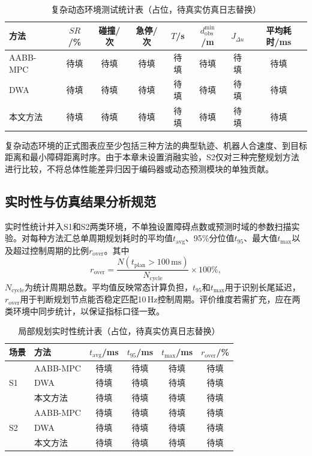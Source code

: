 \begin{table}[!htb]
	\centering
	\caption{复杂动态环境测试统计表（占位，待真实仿真日志替换）}
	\label{tab:动态仿真结果}
	\small
	\begin{tabular}{lccccccc}
		\toprule
		方法 & $SR$/\% & 碰撞/次 & 急停/次 & $T$/s & $d_{\mathrm{obs}}^{\min}$/m & $J_{\Delta u}$ & 平均耗时/ms \\
		\midrule
		AABB-MPC & 待填 & 待填 & 待填 & 待填 & 待填 & 待填 & 待填 \\
		DWA & 待填 & 待填 & 待填 & 待填 & 待填 & 待填 & 待填 \\
		本文方法 & 待填 & 待填 & 待填 & 待填 & 待填 & 待填 & 待填 \\
		\bottomrule
	\end{tabular}
\end{table}

复杂动态环境的正式图表应至少包括三种方法的典型轨迹、机器人合速度、到目标距离和最小障碍距离时序。由于本章未设置消融实验，S2仅对三种完整规划方法进行比较，不将总体性能差异归因于编码器或动态预测模块的单独贡献。

\subsection{实时性与仿真结果分析规范}
实时性统计并入S1和S2两类环境，不单独设置障碍点数或预测时域的参数扫描实验。对每种方法汇总单周期规划耗时的平均值$t_{\mathrm{avg}}$、95\%分位值$t_{95}$、最大值$t_{\max}$以及超过控制周期的比例$r_{\mathrm{over}}$。其中
\begin{equation}
	r_{\mathrm{over}}
	=
	\frac{N(t_{\mathrm{plan}}>100\,\mathrm{ms})}{N_{\mathrm{cycle}}}\times100\%,
	\label{eq:规划周期超时率}
\end{equation}
$N_{\mathrm{cycle}}$为统计周期总数。平均值反映常态计算负担，$t_{95}$和$t_{\max}$用于识别长尾延迟，$r_{\mathrm{over}}$用于判断规划节点能否稳定匹配10\,Hz控制周期。评价维度若需扩充，应在两类环境中同步统计，以保证指标口径一致。

\begin{table}[!htb]
	\centering
	\caption{局部规划实时性统计表（占位，待真实仿真日志替换）}
	\label{tab:仿真实时性}
	\begin{tabular}{llcccc}
		\toprule
		场景 & 方法 & $t_{\mathrm{avg}}$/ms & $t_{95}$/ms & $t_{\max}$/ms & $r_{\mathrm{over}}$/\% \\
		\midrule
		\multirow{3}{*}{S1} & AABB-MPC & 待填 & 待填 & 待填 & 待填 \\
		 & DWA & 待填 & 待填 & 待填 & 待填 \\
		 & 本文方法 & 待填 & 待填 & 待填 & 待填 \\
		\midrule
		\multirow{3}{*}{S2} & AABB-MPC & 待填 & 待填 & 待填 & 待填 \\
		 & DWA & 待填 & 待填 & 待填 & 待填 \\
		 & 本文方法 & 待填 & 待填 & 待填 & 待填 \\
		\bottomrule
	\end{tabular}
\end{table}

